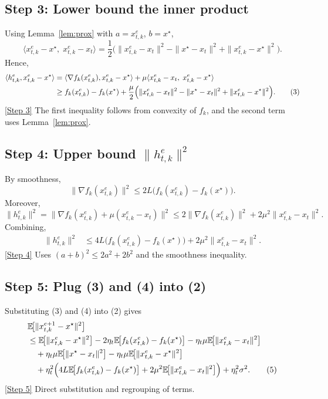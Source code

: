 \documentclass{article}
\newcommand{\E}{\mathbb{E}}
\begin{document}
\subsection*{Step 3: Lower bound the inner product}
Using Lemma~\ref{lem:prox} with $a = x_{t,k}^{e}$, $b = x^\star$,
\[
    \langle x_{t,k}^{e}-x^\star,\;x_{t,k}^{e}-x_t\rangle
    =\frac12\bigl(\|x_{t,k}^{e}-x_t\|^2-\|x^\star-x_t\|^2+\|x_{t,k}^{e}-x^\star\|^2\bigr).
\]
Hence,
\begin{align}
    \langle h_{t,k}^{e},x_{t,k}^{e}-x^\star\rangle
    &=\langle\nabla f_k(x_{t,k}^{e}),x_{t,k}^{e}-x^\star\rangle
      +\mu\langle x_{t,k}^{e}-x_t,\;x_{t,k}^{e}-x^\star\rangle \nonumber\\
    &\ge f_k(x_{t,k}^{e})-f_k(x^\star)
      +\frac{\mu}{2}\Bigl(\|x_{t,k}^{e}-x_t\|^2-\|x^\star-x_t\|^2+\|x_{t,k}^{e}-x^\star\|^2\Bigr) .
      \tag{3}
\end{align}
\noindent\underline{[Step 3]} The first inequality follows from convexity of $f_k$, and the second term uses Lemma~\ref{lem:prox}.

\subsection*{Step 4: Upper bound $\|h_{t,k}^{e}\|^2$}
By smoothness,
\[
    \|\nabla f_k(x_{t,k}^{e})\|^2
    \le 2L\bigl(f_k(x_{t,k}^{e})-f_k(x^\star)\bigr) .
\]
Moreover,
\[
    \|h_{t,k}^{e}\|^2
    =\|\nabla f_k(x_{t,k}^{e})+\mu(x_{t,k}^{e}-x_t)\|^2
    \le 2\|\nabla f_k(x_{t,k}^{e})\|^2
          +2\mu^2\|x_{t,k}^{e}-x_t\|^2 .
\]
Combining,
\begin{align}
    \|h_{t,k}^{e}\|^2
    &\le 4L\bigl(f_k(x_{t,k}^{e})-f_k(x^\star)\bigr)
          +2\mu^2\|x_{t,k}^{e}-x_t\|^2 . \tag{4}
\end{align}
\noindent\underline{[Step 4]} Uses $(a+b)^2\le2a^2+2b^2$ and the smoothness inequality.

\subsection*{Step 5: Plug (3) and (4) into (2)}
Substituting (3) and (4) into (2) gives
\begin{align}
    &\E\!\bigl[\|x_{t,k}^{e+1}-x^\star\|^2\bigr] \nonumber\\
    &\le \E\!\bigl[\|x_{t,k}^{e}-x^\star\|^2\bigr]
       -2\eta_t\E\!\bigl[f_k(x_{t,k}^{e})-f_k(x^\star)\bigr]
       -\eta_t\mu\E\!\bigl[\|x_{t,k}^{e}-x_t\|^2\bigr] \nonumber\\
    &\quad +\eta_t\mu\E\!\bigl[\|x^\star-x_t\|^2\bigr]
       -\eta_t\mu\E\!\bigl[\|x_{t,k}^{e}-x^\star\|^2\bigr] \nonumber\\
    &\quad +\eta_t^2\Bigl(4L\E\!\bigl[f_k(x_{t,k}^{e})-f_k(x^\star)\bigr]
          +2\mu^2\E\!\bigl[\|x_{t,k}^{e}-x_t\|^2\bigr]\Bigr)
          +\eta_t^2\sigma^2 . \tag{5}
\end{align}
\noindent\underline{[Step 5]} Direct substitution and regrouping of terms.
\end{document}
